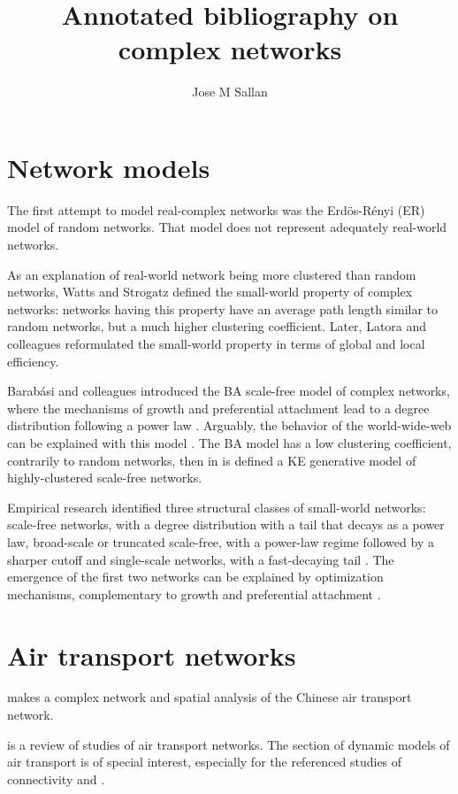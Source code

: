 \documentclass[12pt]{article}
\title{Annotated bibliography on complex networks}
\author{Jose M Sallan}
\date{}
\begin{document}
\maketitle

\section{Network models}

The first attempt to model real-complex networks was the Erdös-R\'enyi (ER) model of random networks. That model does not represent adequately real-world networks. \medskip

As an explanation of real-world network being more clustered than random networks, Watts and Strogatz \cite{Watts1998a} defined the small-world property of complex networks: networks having this property have an average path length similar to random networks, but a much higher clustering coefficient. Later, Latora and colleagues \cite{Latora2001} reformulated the small-world property in terms of global and local efficiency. \medskip

Barab\'asi and colleagues introduced the BA scale-free model of complex networks, where the mechanisms of growth and preferential attachment lead to a degree distribution following a power law \cite{BarabasiA.-L;Albert1999}. Arguably, the behavior of the world-wide-web can be explained with this model \cite{Barabasi2000}. The BA model has a low clustering coefficient, contrarily to random networks, then in \cite{Klemm2002} is defined a KE generative model of highly-clustered scale-free networks. \medskip

Empirical research identified three structural classes of small-world networks: scale-free networks, with a degree distribution with a tail that decays as a power law, broad-scale or truncated scale-free, with a power-law regime followed by a  sharper cutoff and single-scale networks, with a  fast-decaying tail \cite{Amaral2000}. The emergence of the first two networks can be explained by optimization mechanisms, complementary to growth and preferential attachment \cite{Cancho2003}.

\section{Air transport networks}

\cite{Lin2012a} makes a complex network and spatial analysis of the Chinese air transport network.\medskip

\cite{Zanin2013} is a review of studies of air transport networks. The section of dynamic models of air transport is of special interest, especially for the referenced studies of connectivity \cite{Burghouwt2005} and \cite{Malighetti2008}. 
\end{document}
